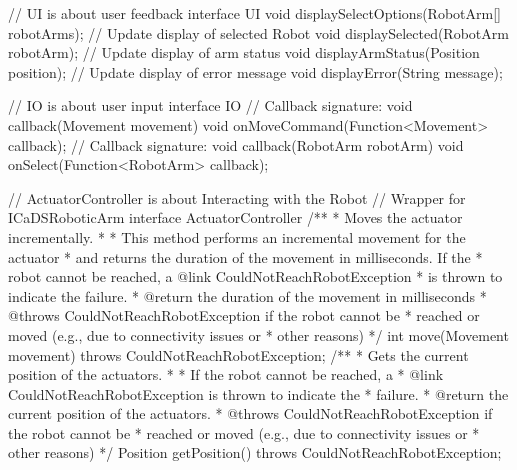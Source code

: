 \begin{Java}[caption={Interfaces}]
// UI is about user feedback
interface UI {
	void displaySelectOptions(RobotArm[] robotArms);
    // Update display of selected Robot
	void displaySelected(RobotArm robotArm);
    // Update display of arm status
	void displayArmStatus(Position position);
    // Update display of error message
	void displayError(String message);
}

// IO is about user input
interface IO {
    // Callback signature: void callback(Movement movement) 
	void onMoveCommand(Function<Movement> callback);
	// Callback signature: void callback(RobotArm robotArm) 
    void onSelect(Function<RobotArm> callback);
}

// ActuatorController is about Interacting with the Robot
// Wrapper for ICaDSRoboticArm
interface ActuatorController {
    /**
     * Moves the actuator incrementally.
     * 
     * This method performs an incremental movement for the actuator 
     * and returns the duration of the movement in milliseconds. If the 
     * robot cannot be reached, a {@link CouldNotReachRobotException}  
     * is thrown to indicate the failure.
     * @return the duration of the movement in milliseconds
     * @throws CouldNotReachRobotException if the robot cannot be 
     *      reached or moved (e.g., due to connectivity issues or 
     *      other reasons)
     */
    int move(Movement movement) throws CouldNotReachRobotException;
    /**
     * Gets the current position of the actuators.
     * 
     * If the robot cannot be reached, a 
     * {@link CouldNotReachRobotException} is thrown to indicate the 
     * failure.
     * @return the current position of the actuators.
     * @throws CouldNotReachRobotException if the robot cannot be 
     *      reached or moved (e.g., due to connectivity issues or 
     *      other reasons)
     */
    Position getPosition() throws CouldNotReachRobotException;
}
\end{Java}

